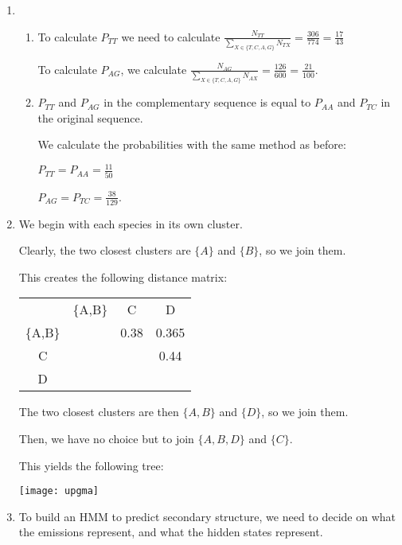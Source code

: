 


\begin{enumerate}[label=(\alph*)]

  \item
    \begin{enumerate}[label=(\roman*)]

      \item

        To calculate $P_{TT}$ we need to calculate $\frac{N_{TT}}{\sum_{X \in \{T,C,A,G\}} N_{TX}} = \frac{306}{774} = \frac{17}{43}$

        To calculate $P_{AG}$, we calculate $\frac{N_{AG}}{\sum_{X \in \{T,C,A,G\}} N_{AX}} = \frac{126}{600} = \frac{21}{100}$.

      \item
        $P_{TT}$ and $P_{AG}$ in the complementary sequence is equal to $P_{AA}$ and $P_{TC}$ in the original sequence.

        We calculate the probabilities with the same method as before:

        $P_{TT} = P_{AA} = \frac{11}{50}$

        $P_{AG} = P_{TC} = \frac{38}{129}$.

    \end{enumerate}

  \item
    We begin with each species in its own cluster.

    Clearly, the two closest clusters are $\{A\}$ and $\{B\}$, so we join them.

    This creates the following distance matrix:

    \begin{tabular}{cccc}
      &\{A,B\}&C&D\\
      \{A,B\}&&0.38&0.365\\ 
      C&&&0.44\\
      D&\\
    \end{tabular}

    The two closest clusters are then $\{A,B\}$ and $\{D\}$, so we join them.

    Then, we have no choice but to join $\{A,B,D\}$ and $\{C\}$.

    This yields the following tree:


    \texttt{[image: upgma]}

  \item
    To build an HMM to predict secondary structure, we need to decide on what the emissions represent, and what the hidden states represent.


\end{enumerate}
